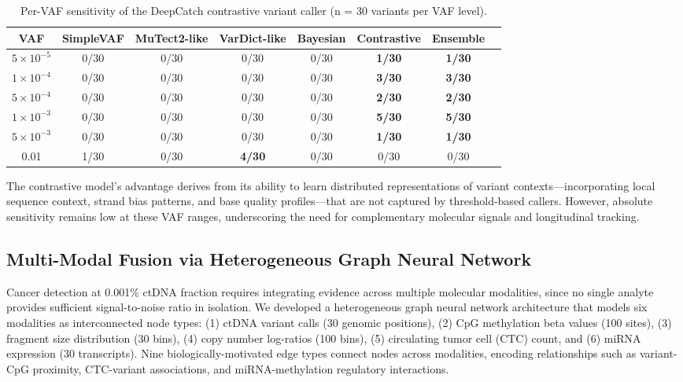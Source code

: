 \documentclass[10pt,a4paper]{article}
\begin{document}
\begin{table}[H]
\centering
\caption{Per-VAF sensitivity of the DeepCatch contrastive variant caller (n = 30 variants per VAF level).}
\label{tab:vaf_sensitivity}
\begin{tabular}{c c c c c c c c}
\toprule
\textbf{VAF} & \textbf{SimpleVAF} & \textbf{MuTect2-like} & \textbf{VarDict-like} & \textbf{Bayesian} & \textbf{Contrastive} & \textbf{Ensemble} \\
\midrule
$5\times10^{-5}$ & 0/30 & 0/30 & 0/30 & 0/30 & \textbf{1/30} & \textbf{1/30} \\
$1\times10^{-4}$ & 0/30 & 0/30 & 0/30 & 0/30 & \textbf{3/30} & \textbf{3/30} \\
$5\times10^{-4}$ & 0/30 & 0/30 & 0/30 & 0/30 & \textbf{2/30} & \textbf{2/30} \\
$1\times10^{-3}$ & 0/30 & 0/30 & 0/30 & 0/30 & \textbf{5/30} & \textbf{5/30} \\
$5\times10^{-3}$ & 0/30 & 0/30 & 0/30 & 0/30 & \textbf{1/30} & \textbf{1/30} \\
0.01 & 1/30 & 0/30 & \textbf{4/30} & 0/30 & 0/30 & 0/30 \\
\bottomrule
\end{tabular}
\end{table}

The contrastive model's advantage derives from its ability to learn distributed representations of variant contexts—incorporating local sequence context, strand bias patterns, and base quality profiles—that are not captured by threshold-based callers. However, absolute sensitivity remains low at these VAF ranges, underscoring the need for complementary molecular signals and longitudinal tracking.

\subsection{Multi-Modal Fusion via Heterogeneous Graph Neural Network}

Cancer detection at 0.001\% ctDNA fraction requires integrating evidence across multiple molecular modalities, since no single analyte provides sufficient signal-to-noise ratio in isolation. We developed a heterogeneous graph neural network architecture that models six modalities as interconnected node types: (1) ctDNA variant calls (30 genomic positions), (2) CpG methylation beta values (100 sites), (3) fragment size distribution (30 bins), (4) copy number log-ratios (100 bins), (5) circulating tumor cell (CTC) count, and (6) miRNA expression (30 transcripts). Nine biologically-motivated edge types connect nodes across modalities, encoding relationships such as variant-CpG proximity, CTC-variant associations, and miRNA-methylation regulatory interactions.
\end{document}
